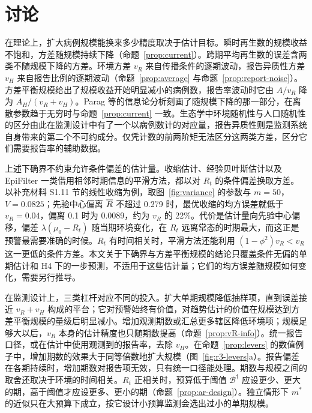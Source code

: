 \section{讨论}
\label{sec:discussion}

在理论上，扩大病例规模能换来多少精度取决于估计目标。瞬时再生数的规模收益不饱和，方差随规模持续下降（命题~\ref{prop:current}）。跨期平均再生数的误差含两类不随规模下降的方差。环境方差 $v_R$ 来自传播条件的逐期波动，报告异质性方差 $v_H$ 来自报告比例的逐期波动（命题~\ref{prop:average} 与命题~\ref{prop:report-noise}）。方差平衡规模给出了规模收益开始明显减小的病例数，报告率波动时它由 $A/v_R$ 降为 $A_H/(v_R+v_H)$。Parag 等\citep{parag2022quantifying, parag2022fundamental}的信息论分析刻画了随规模下降的那一部分，在离散参数趋于无穷时与命题~\ref{prop:current} 一致。生态学中环境随机性与人口随机性的区分\citep{engen1998demographic, rohani2002determinism}由此在监测设计中有了一个以病例数计的对应量，报告异质性则是监测系统自身带来的第二个不可约成分。仅凭计数的前两阶矩无法区分这两类方差，区分它们需要报告率的辅助数据。

上述下确界不约束允许条件偏差的估计量。收缩估计、经验贝叶斯估计\citep{efron1975data}以及 EpiFilter 一类借用相邻时期信息的平滑方法\citep{parag2021improved}，都以对 $R_t$ 的条件偏差换取方差。以补充材料 S1.11 节的线性收缩为例，取图~\ref{fig:variance} 的参数与 $m=50$，$V=0.0825$；先验中心偏离 $\overline{R}$ 不超过 0.279 时，最优收缩的均方误差就低于 $v_R=0.04$，偏离 0.1 时为 0.0089，约为 $v_R$ 的 22\%。代价是估计量向先验中心偏移，偏差 $\lambda(\mu_0-R_t)$ 随当期环境变化，在 $R_t$ 远离常态的时期最大，而这正是预警最需要准确的时候。$R_t$ 有时间相关时，平滑方法还能利用 $(1-\phi^2)v_R<v_R$ 这一更低的条件方差。本文关于下确界与方差平衡规模的结论只覆盖条件无偏的单期估计和 H4 下的一步预测，不适用于这些估计量；它们的均方误差随规模如何变化，需要另行推导。

在监测设计上，三类杠杆对应不同的投入。扩大单期规模降低抽样项，直到误差接近 $v_R+v_H$ 构成的平台；它对预警始终有价值，对趋势估计的价值在规模达到方差平衡规模的量级后明显减小。增加观测期数或汇总更多辖区降低环境项；规模足够大以后，$v_R$ 本身的估计精度也只随期数提高（命题~\ref{prop:vR-info}）。统一报告口径，或在估计中使用观测到的报告率，去除 $v_H$。在命题~\ref{prop:levers} 的数值例子中，增加期数的效果大于同等倍数地扩大规模（图~\ref{fig:r3-levers}a）。报告偏差在各期持续时，增加期数对报告项无效，只有统一口径能处理。期数与规模之间的取舍还取决于环境的时间相关。$R_t$ 正相关时，预算低于阈值 $\mathcal B^\dagger$ 应设更少、更大的期，高于阈值才应设更多、更小的期（命题~\ref{prop:ar-design}）。独立情形下 $m^*$ 的近似只在大预算下成立，按它设计小预算监测会选出过小的单期规模。

